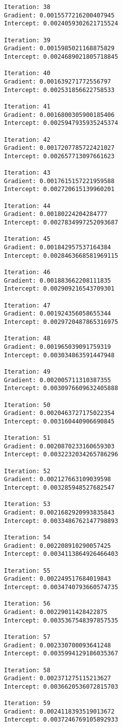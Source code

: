 \documentclass[11pt]{article}
\begin{document}
\begin{Verbatim}[commandchars=\\\{\}]
Iteration: 38 
Gradient: 0.0015577216200407945 
Intercept: 0.0024059302621715524 

Iteration: 39 
Gradient: 0.0015985021168875829 
Intercept: 0.0024689021805718845 

Iteration: 40 
Gradient: 0.001639271772556797 
Intercept: 0.002531856622758533 

Iteration: 41 
Gradient: 0.0016800305900185406 
Intercept: 0.0025947935935245374 

Iteration: 42 
Gradient: 0.0017207785722421027 
Intercept: 0.002657713097661623 

Iteration: 43 
Gradient: 0.0017615157221959588 
Intercept: 0.002720615139960201 

Iteration: 44 
Gradient: 0.00180224204284777 
Intercept: 0.0027834997252093687 

Iteration: 45 
Gradient: 0.001842957537164384 
Intercept: 0.0028463668581969115 

Iteration: 46 
Gradient: 0.001883662208111835 
Intercept: 0.002909216543709301 

Iteration: 47 
Gradient: 0.001924356058655344 
Intercept: 0.0029720487865316975 

Iteration: 48 
Gradient: 0.001965039091759319 
Intercept: 0.003034863591447948 

Iteration: 49 
Gradient: 0.002005711310387355 
Intercept: 0.0030976609632405888 

Iteration: 50 
Gradient: 0.0020463727175022354 
Intercept: 0.003160440906690845 

Iteration: 51 
Gradient: 0.0020870233160659303 
Intercept: 0.0032232034265786296 

Iteration: 52 
Gradient: 0.002127663109039598 
Intercept: 0.003285948527682547 

Iteration: 53 
Gradient: 0.0021682920993835843 
Intercept: 0.0033486762147798893 

Iteration: 54 
Gradient: 0.002208910290057425 
Intercept: 0.0034113864926466403 

Iteration: 55 
Gradient: 0.002249517684019843 
Intercept: 0.0034740793660574735 

Iteration: 56 
Gradient: 0.00229011428422875 
Intercept: 0.0035367548397857535 

Iteration: 57 
Gradient: 0.002330700093641248 
Intercept: 0.0035994129186035367 

Iteration: 58 
Gradient: 0.002371275115213627 
Intercept: 0.0036620536072815703 

Iteration: 59 
Gradient: 0.0024118393519013672 
Intercept: 0.0037246769105892933 


\end{Verbatim}
\end{document}
